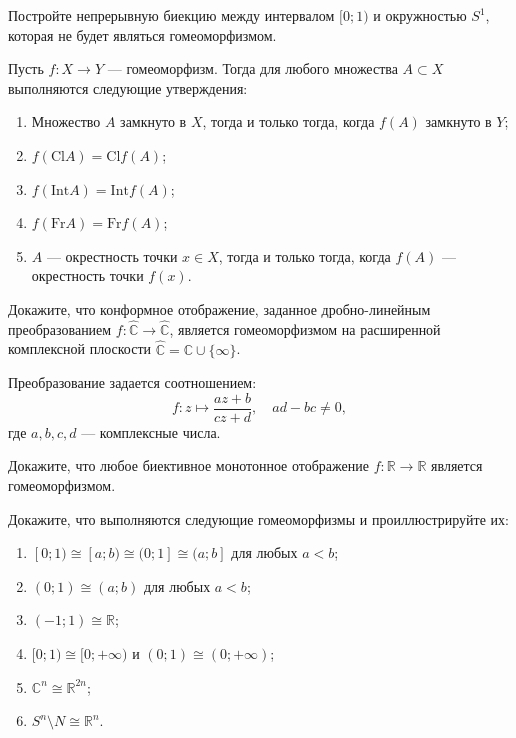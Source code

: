 \begin{task}
    Постройте непрерывную биекцию между интервалом \( [0; 1) \) и окружностью \( S^1 \), которая не будет являться гомеоморфизмом.
\end{task}


\begin{task}
    Пусть \( f : X \to Y \) — гомеоморфизм. Тогда для любого множества \( A \subset X \) выполняются следующие утверждения:
    \begin{enumerate}
        \item Множество \( A \) замкнуто в \( X \), тогда и только тогда, когда \( f(A) \) замкнуто в \( Y \);
        \item \( f(\text{Cl} A) = \text{Cl} f(A) \);
        \item \( f(\text{Int} A) = \text{Int} f(A) \);
        \item \( f(\text{Fr} A) = \text{Fr} f(A) \);
        \item \( A \) — окрестность точки \( x \in X \), тогда и только тогда, когда  \( f(A) \) — окрестность точки \( f(x) \).
    \end{enumerate}
\end{task}


\begin{task}
	Докажите, что конформное отображение, заданное дробно-линейным преобразованием \( f : \hat{\mathbb{C}} \to \hat{\mathbb{C}} \), является гомеоморфизмом на расширенной комплексной плоскости \( \hat{\mathbb{C}} = \mathbb{C} \cup \{\infty\} \). 

	Преобразование задается соотношением:
	\[
	f: z \mapsto \frac{az + b}{cz + d}, \quad ad - bc \neq 0,
	\]
	где \( a, b, c, d \) — комплексные числа.	
\end{task}
\begin{task}
    Докажите, что любое биективное монотонное отображение \( f : \mathbb{R} \to \mathbb{R} \) является гомеоморфизмом. 
\end{task}

\begin{task}
		Докажите, что выполняются следующие гомеоморфизмы и проиллюстрируйте их:
		\begin{enumerate}
			\item \( [0; 1) \cong [a; b) \cong (0; 1] \cong (a; b] \) для любых \( a < b \);
			\item \( (0; 1) \cong (a; b) \) для любых \( a < b \);
			\item \( (-1; 1) \cong \mathbb{R} \);
			\item \( [0; 1) \cong [0; +\infty) \) и \( (0; 1) \cong (0; +\infty) \);
			\item \( \mathbb{C}^n \cong \mathbb{R}^{2n} \);
			\item \( S^n \setminus N \cong \mathbb{R}^n \).
		\end{enumerate}	
\end{task}

